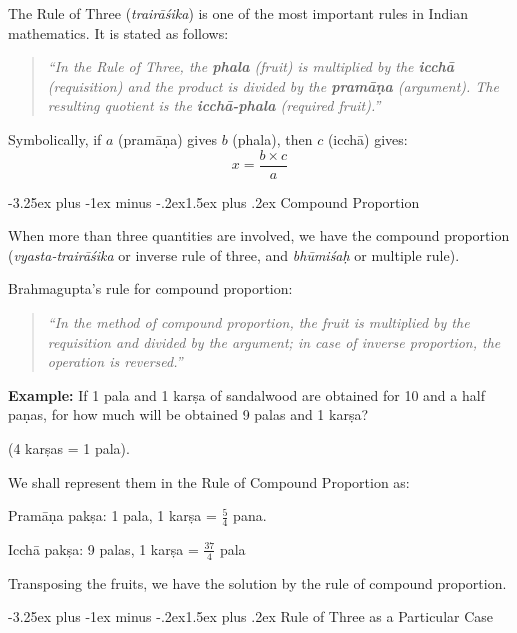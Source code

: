 \documentclass[11pt,a4paper]{article}
\makeatletter
\renewcommand{\subsection}{\@startsection{subsection}{2}{\z@}%
  {-3.25ex plus -1ex minus -.2ex}{1.5ex plus .2ex}%
  {\normalfont\large\bfseries\color{sectioncolor}}}
\makeatother
\begin{document}
The Rule of Three (\textit{trairāśika}) is one of the most important rules in Indian mathematics. It is stated as follows:

\begin{quote}
\textit{``In the Rule of Three, the \textbf{phala} (fruit) is multiplied by the \textbf{icchā} (requisition) and the product is divided by the \textbf{pramāṇa} (argument). The resulting quotient is the \textbf{icchā-phala} (required fruit).''}
\end{quote}

Symbolically, if $a$ (pramāṇa) gives $b$ (phala), then $c$ (icchā) gives:
\[
x = \frac{b \times c}{a}
\]

\subsection{Compound Proportion}

When more than three quantities are involved, we have the compound proportion (\textit{vyasta-trairāśika} or inverse rule of three, and \textit{bhūmiśaḥ} or multiple rule).

Brahmagupta's rule for compound proportion:

\begin{quote}
\textit{``In the method of compound proportion, the fruit is multiplied by the requisition and divided by the argument; in case of inverse proportion, the operation is reversed.''}
\end{quote}

\textbf{Example:} If 1 pala and 1 karṣa of sandalwood are obtained for 10 and a half paṇas, for how much will be obtained 9 palas and 1 karṣa?

(4 karṣas = 1 pala).

We shall represent them in the Rule of Compound Proportion as:

Pramāṇa pakṣa: 1 pala, 1 karṣa = $\frac{5}{4}$ pana.

Icchā pakṣa: 9 palas, 1 karṣa = $\frac{37}{4}$ pala

Transposing the fruits, we have the solution by the rule of compound proportion.

\subsection{Rule of Three as a Particular Case}
\end{document}
